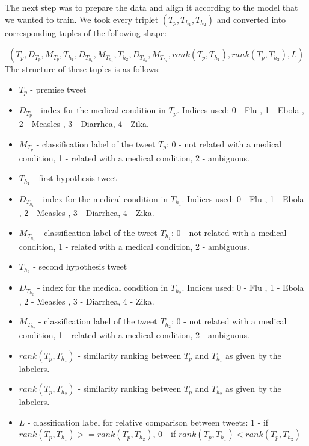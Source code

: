 \documentclass[12pt]{report}
\begin{document}
The next step was to prepare the data and align it according to the model that we wanted to train. We took every triplet $(T_p, T_{h_1}, T_{h_2})$
and converted into corresponding tuples of the following shape:

\[
(T_p, D_{T_p}, M_{T_p}, T_{h_1}, D_{T_{h_1}}, M_{T_{h_1}},T_{h_2}, D_{T_{h_2}}, M_{T_{h_2}}, rank(T_p, T_{h_1}), rank(T_p, T_{h_2}), L)
\]
The structure of these tuples is as follows:
\begin{itemize}
	\item $T_p$ - premise tweet
	\item $D_{T_p}$ - index for the medical condition in $T_p$. Indices used: 0 - Flu , 1 - Ebola , 2 - Measles  , 3 - Diarrhea, 4 - Zika. 
	\item  $M_{T_p}$ - classification label of the tweet $T_p$: 0 - not related with a medical condition, 1 - related with a medical condition, 2 - ambiguous. 
	\item $T_{h_1}$ - first hypothesis tweet
	\item $D_{T_{h_1}}$ - index for the medical condition in $T_{h_1}$. Indices used: 0 - Flu , 1 - Ebola , 2 - Measles  , 3 - Diarrhea, 4 - Zika. 
	\item  $M_{T_{h_1}}$ - classification label of the tweet  $T_{h_1}$: 0 - not related with a medical condition, 1 - related with a medical condition, 2 - ambiguous. 
	\item $T_{h_2}$ - second hypothesis tweet
	\item $D_{T_{h_2}}$ - index for the medical condition in $T_{h_2}$. Indices used: 0 - Flu , 1 - Ebola , 2 - Measles  , 3 - Diarrhea, 4 - Zika. 
	\item  $M_{T_{h_2}}$ - classification label of the tweet $T_{h_2}$: 0 - not related with a medical condition, 1 - related with a medical condition, 2 - ambiguous. 
	\item $rank(T_p, T_{h_1})$ - similarity ranking between $T_p$ and  $T_{h_1}$ as given by the labelers.
	\item $rank(T_p, T_{h_2})$ - similarity ranking between $T_p$ and  $T_{h_2}$ as given by the labelers.
	\item $L$ -  classification label for relative comparison between tweets: 1 - if $rank(T_p, T_{h_1}) >= rank(T_p, T_{h_2})$, 0 - if  $rank(T_p, T_{h_1}) < rank(T_p, T_{h_2})$
	
\end{itemize}
\end{document}
